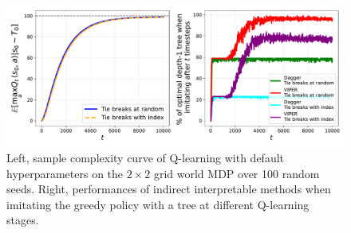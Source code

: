 \begin{figure}
    \centering
    \includegraphics[width=1\textwidth]{images/images_part1/base_mdp.pdf}
    \caption{Left, sample complexity curve of Q-learning with default hyperparameters on the $2\times 2$ grid world MDP over 100 random seeds. Right, performances of indirect interpretable methods when imitating the greedy policy with a tree at different Q-learning stages. }
\end{figure}
